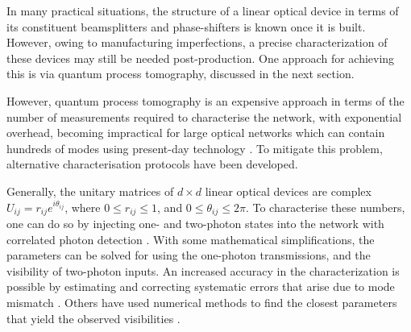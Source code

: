 \documentclass[times,final]{elsarticle}
\begin{document}
In many practical situations, the structure of a linear optical device in terms of its constituent beamsplitters and phase-shifters is known once it is built. However, owing to manufacturing imperfections, a precise characterization of these devices may still be needed post-production. One approach for achieving this is via quantum process tomography, discussed in the next section.

However, quantum process tomography is an expensive approach in terms of the number of measurements required to characterise the network, with exponential overhead, becoming impractical for large optical networks which can contain hundreds of modes using present-day technology \cite{bib:Harris16}. To mitigate this problem, alternative characterisation protocols have been developed.

Generally, the unitary matrices of $d\times d$ linear optical devices are complex $U_{ij}=r_{ij}e^{i\theta_{ij}}$, where $0 \leq r_{ij}\leq 1$, and $0\leq \theta_{ij}\leq 2\pi$. To characterise these numbers, one can do so by injecting one- and two-photon states into the network with correlated photon detection \cite{bib:Laing12}. With some mathematical simplifications, the parameters can be solved for using the one-photon transmissions, and the visibility of two-photon inputs.
%
%
An increased accuracy in the characterization is possible by estimating 
and correcting systematic errors that arise due to mode mismatch 
\cite{Dhand16}. Others have used numerical methods to find the closest 
parameters that yield the observed visibilities 
\cite{bib:Spagnolo16,bib:Tillmann16}.
\end{document}
